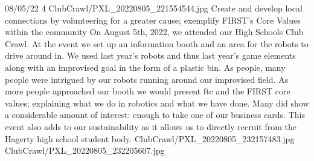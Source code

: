 {08/05/22}
{4}
{ClubCrawl/PXL_20220805_221554544.jpg}
{Create and develop local connections by volunteering for a greater cause; exemplify FIRST's Core Values within the community} 
{On August 5th, 2022, we attended our High Schools Club Crawl. At the event we set up an information booth and an area for the robots to drive around in. We used last year’s robots and thus last year’s game elements along with an improvised goal in the form of a plastic bin. As people, many people were intrigued by our robots running around our improvised field. As more people approached our booth we would present ftc and the FIRST core values; explaining what we do in robotics and what we have done. Many did show a considerable amount of interest: enough to take one of our business cards. This event also adds to our sustainability as it allows us to directly recruit from the Hagerty high school student body. 
} 
{ClubCrawl/PXL_20220805_232157483.jpg}
{ClubCrawl/PXL_20220805_232205607.jpg}



